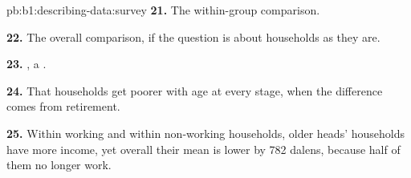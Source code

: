 \begin{solution}{pb:b1:describing-data:survey}
\textbf{21.} The within-group comparison.

\textbf{22.} The overall comparison, if the question is about households as
they are.

\textbf{23.} , a .

\textbf{24.} That households get poorer with age at every stage, when the
difference comes from retirement.

\textbf{25.} Within working and within non-working households, older heads'
households have more income, yet overall their mean is lower by 782
dalens, because half of them no longer work.
\end{solution}
